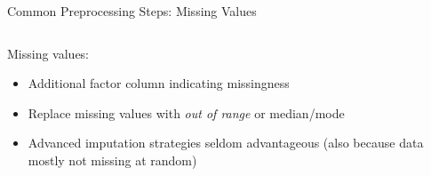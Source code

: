 \begin{frame}{Common Preprocessing Steps: Missing Values}
  \begin{columns}
    \begin{column}{0.7\textwidth}
      Missing values:
      \begin{itemize}
        \item Additional factor column indicating missingness
        \item Replace missing values with \emph{out of range} or median/mode
        \item Advanced imputation strategies seldom advantageous (also because data mostly not missing at random)
      \end{itemize}
    \end{column}%
    \begin{column}{0.3\textwidth}
            \vspace{-0.65cm}
      \begin{center}
\end{center}
\end{column}
\end{columns}
\end{frame}
